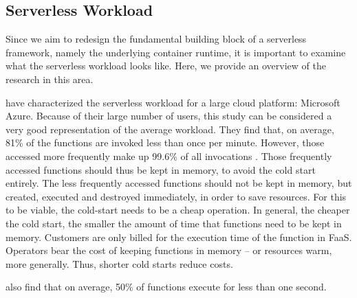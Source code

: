 \subsection{Serverless Workload}
\label{section:serverless_workload}

Since we aim to redesign the fundamental building block of a serverless framework, namely the underlying container runtime, it is important to examine what the serverless workload looks like. Here, we provide an overview of the research in this area.

\citeauthor{Shahrad2020} have characterized the serverless workload for a large cloud platform: Microsoft Azure. Because of their large number of users, this study can be considered a very good representation of the average workload.
They find that, on average, 81\% of the functions are invoked less than once per minute. However, those accessed more frequently make up 99.6\% of all invocations \cite{Shahrad2020}.
Those frequently accessed functions should thus be kept in memory, to avoid the cold start entirely. The less frequently accessed functions should not be kept in memory, but created, executed and destroyed immediately, in order to save resources. For this to be viable, the cold-start needs to be a cheap operation. In general, the cheaper the cold start, the smaller the amount of time that functions need to be kept in memory.
Customers are only billed for the execution time of the function in FaaS. Operators bear the cost of keeping functions in memory -- or resources warm, more generally. Thus, shorter cold starts reduce costs.

\citeauthor{Shahrad2020} also find that on average, 50\% of functions execute for less than one second.

\begin{quote}
\end{quote}

